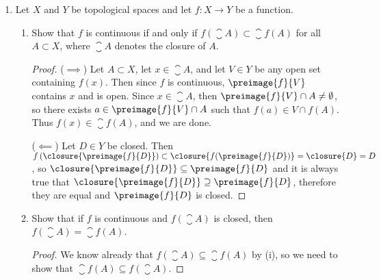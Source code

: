 \documentclass[12pt,letterpaper]{article}
\renewcommand{\T}{\pazocal{T}}
\begin{document}
\begin{enumerate}
\begin{proof}
\begin{enumerate}[label=(\roman*)]
	\item Let $\T'\subseteq\T$. We will show that if $(X,\T')$ is Hausdorff, then $\T'\supseteq \T$, so $\T'= \T$. Let $W$ be open in $\T$, and let $x\in W$. Since $(X,\T')$ is Hausdorff, then for every $y\in W^\complement$, there exist sets $U_y'\ni x$, $V_y'\ni y$ which are open in $\T'$ and disjoint. Since $W^\complement$ is closed in $(X,\T)$, and $(X,\T)$ is compact, and $\{V_y'\}_{v\in W^\complement}\subset\T'\subseteq\T$, then we can produce a finite subcover $\{V_{y_i}'\}_{i=1}^N$ of $W^\complement$. Now for each $V'$ we have a corresponding $U'$, so by similar reasoning as in (i) we find that $\bigcap_{i=1}^NU_{y_i}'$ is open in $\T'$, disjoint with $\bigcup_{i=1}^NV_{y_i}'$ so a subset of $W$, and contains $x$ by construction. Thus by the openness criterion, $W$ is open in $\T'$. 
	\end{enumerate}
\end{proof}

\pagebreak 
\item Let $X$ and $Y$ be topological spaces and let $f:X\to Y$ be a function. 

\begin{enumerate}[label=(\roman*)]
\item Show that $f$ is continuous if and only if $f(\closure{A})\subset \closure{f(A)}$ for all $A\subset X$, where $\closure{A}$ denotes the closure of $A$. 
\begin{proof}\mbox{} 

($\implies$) %
Let $A\subset X$, let $x\in\closure{A}$, and let $V\in Y$ be any open set containing $f(x)$. Then since $f$ is continuous, $\preimage{f}{V}$ contains $x$ and is open. Since $x\in\closure{A}$, then $\preimage{f}{V}\cap A\neq\emptyset$, so there exists $a\in \preimage{f}{V}\cap A$ such that $f(a)\in V\cap f(A)$. Thus $f(x)\in\closure{f(A)}$, and we are done. \qedwhite

($\impliedby$) Let $D\in Y$ be closed. Then $f\left(\closure{\preimage{f}{D}}\right)\subset\closure{f(\preimage{f}{D})}=\closure{D}=D$, so $\closure{\preimage{f}{D}}\subseteq\preimage{f}{D}$ and it is always true that $\closure{\preimage{f}{D}}\supseteq\preimage{f}{D}$, therefore they are equal and $\preimage{f}{D}$ is closed. 
\end{proof}

\item Show that if $f$ is continuous and $f(\closure{A})$ is closed, then $f(\closure{A})=\closure{f(A)}$. 
\begin{proof}
We know already that $f(\closure{A})\subseteq\closure{f(A)}$ by (i), so we need to show that $\closure{f(A)}\subseteq f(\closure{A})$. 


\end{proof}
\end{enumerate}
\end{enumerate}
\end{document}

